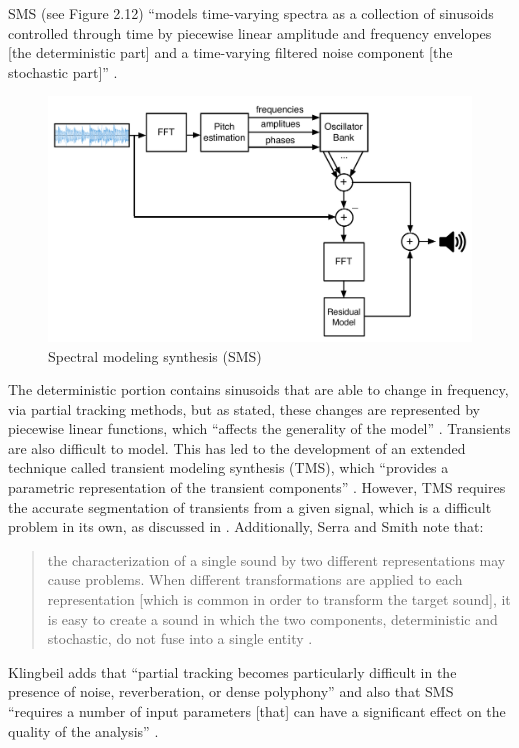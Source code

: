 \documentclass[12pt]{report} 	%
\numberwithin{figure}{chapter}
\numberwithin{table}{chapter}
\numberwithin{equation}{chapter}
\begin{document}
\begin{flushleft}
SMS (see Figure 2.12) ``models time-varying spectra as a collection of sinusoids controlled through time by piecewise linear amplitude and frequency envelopes [the deterministic part] and a time-varying filtered noise component [the stochastic part]'' \cite[p. 12]{Serra:1990dk}. 
\begin{figure}[h!]
\begin{center}
\includegraphics[scale=0.55]{SMS}
\caption[SMS]{Spectral modeling synthesis (SMS)}
\end{center}
\end{figure}
The deterministic portion contains sinusoids that are able to change in frequency, via partial tracking methods, but as stated, these changes are represented by piecewise linear functions, which ``affects the generality of the model'' \cite[p. 31]{Tolonen:1998bh}. Transients are also difficult to model. This has led to the development of an extended technique called transient modeling synthesis (TMS), which ``provides a parametric representation of the transient components'' \cite[p. 33]{Tolonen:1998bh}. However, TMS requires the accurate segmentation of transients from a given signal, which is a difficult problem in its own, as discussed in \cite[p. 16]{Ciglar:2009uf}. Additionally, Serra and Smith note that:
\begin{singlespace}
\begin{quote}
\selectfont
the characterization of a single sound by two different representations may cause problems. When different transformations are applied to each representation [which is common in order to transform the target sound], it is easy to create a sound in which the two components, deterministic and stochastic, do not fuse into a single entity \cite[p. 23]{Serra:1990dk}.
\end{quote}
\selectfont
\end{singlespace}
Klingbeil adds that ``partial tracking becomes particularly difficult in the presence of noise, reverberation, or dense polyphony'' and also that SMS ``requires a number of input parameters [that] can have a significant effect on the quality of the analysis'' \cite[p. 42]{Klingbeil:2009lo}.


\end{flushleft}
\end{document}
